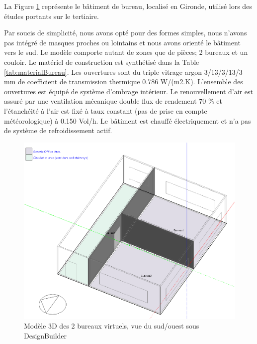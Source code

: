 La Figure \ref{fig:CasEtudeBureau} représente le bâtiment de bureau, localisé en Gironde, utilisé lors des études portants sur le tertiaire. 

Par soucis de simplicité, nous avons opté pour des formes simples, nous n'avons pas intégré de masques proches ou lointains et nous avons orienté le bâtiment vers le sud. Le modèle comporte autant de zones que de pièces; 2 bureaux et un couloir. Le matériel de construction est synthétisé dans la Table \ref{tab:materialBureau}. Les ouvertures sont du triple vitrage argon 3/13/3/13/3 mm de coefficient de transmission thermique 0.786 W/(m2.K). L'ensemble des ouvertures est équipé de système d'ombrage intérieur. Le renouvellement d'air est assuré par une ventilation mécanique double flux de rendement 70 \% et l'étanchéité à l'air est fixé à taux constant (pas de prise en compte météorologique) à 0.150 Vol/h. Le bâtiment est chauffé électriquement et n'a pas de système de refroidissement actif.

\begin{figure}[H]
\centering
\includegraphics[scale=0.55]{Images/CasEtudeBureau}
\caption{Modèle 3D des 2 bureaux virtuels, vue du sud/ouest sous DesignBuilder}
\label{fig:CasEtudeBureau}
\end{figure}

